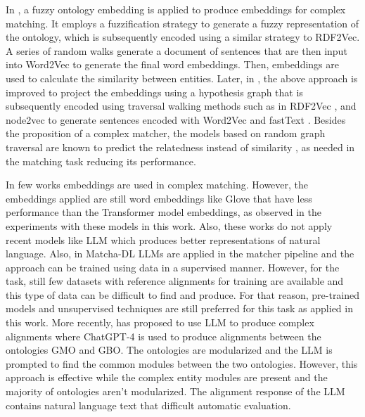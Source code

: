 In \cite{DBLP:conf/dis/AkremiAZ22}, a fuzzy ontology embedding is applied to produce embeddings for complex matching. It employs a fuzzification strategy to generate a fuzzy representation of the ontology, which is subsequently encoded using a similar strategy to RDF2Vec. A series of random walks generate a document of sentences that are then input into Word2Vec to generate the final word embeddings. Then, embeddings are used to calculate the similarity between entities. Later, in \cite{DBLP:conf/inista/AkremiAZ23}, the above approach is improved to project the embeddings using a hypothesis graph \cite{DBLP:journals/biomedsem/AgibetovJOSBGCO18} that is subsequently encoded using traversal walking methods such as in RDF2Vec \cite{DBLP:conf/semweb/RistoskiP16}, and node2vec \cite{DBLP:conf/kdd/GroverL16} to generate sentences encoded with Word2Vec and fastText \cite{DBLP:journals/tacl/BojanowskiGJM17}. Besides the proposition of a complex matcher, the models based on random graph traversal are known to predict the relatedness instead of similarity \cite{DBLP:conf/esws/PortischCSKHP22}, as needed in the matching task reducing its performance.

In few works \cite{DBLP:conf/i-semantics/DhouibFT19,DBLP:journals/jodsn/DhouibFT21,DBLP:conf/dis/AkremiAZ22} embeddings are used in complex matching. However, the embeddings applied are still word embeddings like Glove that have less performance than the Transformer model embeddings, as observed in the experiments with these models in this work. Also, these works do not apply recent models like LLM which produces better representations of natural language. Also, in Matcha-DL \cite{DBLP:conf/om2/FariaSCFBP23} LLMs are applied in the matcher pipeline and the approach can be trained using data in a supervised manner. However, for the task, still few datasets with reference alignments for training are available and this type of data can be difficult to find and produce. For that reason, pre-trained models and unsupervised techniques are still preferred for this task as applied in this work. More recently, \cite{DBLP:journals/corr/abs-2404-10329} has proposed to use LLM to produce complex alignments where ChatGPT-4 is used to produce alignments between the ontologies GMO and GBO. The ontologies are modularized and the LLM is prompted to find the common modules between the two ontologies. However, this approach is effective while the complex entity modules are present and the majority of ontologies aren't modularized. The alignment response of the LLM contains natural language text that difficult automatic evaluation.